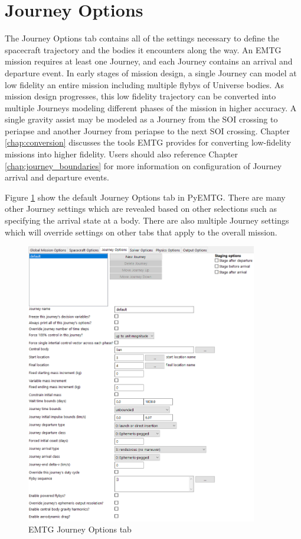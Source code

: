 \section{Journey Options}
\label{sec:journey_options}
The Journey Options tab contains all of the settings necessary to define the spacecraft trajectory and the bodies it encounters along the way. An \ac{EMTG} mission requires at least one Journey, and each Journey contains an arrival and departure event. In early stages of mission design, a single Journey can model at low fidelity an entire mission including multiple flybys of Universe bodies. As mission design progresses, this low fidelity trajectory can be converted into multiple Journeys modeling different phases of the mission in higher accuracy. A single gravity assist may be modeled as a Journey from the \ac{SOI} crossing to periapse and another Journey from periapse to the next \ac{SOI} crossing. Chapter \ref{chap:conversion} discusses the tools \ac{EMTG} provides for converting low-fidelity missions into higher fidelity. Users should also reference Chapter \ref{chap:journey_boundaries} for more information on configuration of Journey arrival and departure events.

\noindent Figure \ref{fig:pyemtg_journey_options} show the default Journey Options tab in PyEMTG. There are many other Journey settings which are revealed based on other selections such as specifying the arrival state at a body. There are also multiple Journey settings which will override settings on other tabs that apply to the overall mission. 

    \begin{figure}[H]
        \centering
        \includegraphics[width=0.9\textwidth]{../../shared_latex_inputs/images/pyemtg_journey_options_tab.png}
        \caption{EMTG Journey Options tab}
        \label{fig:pyemtg_journey_options}
    \end{figure}


